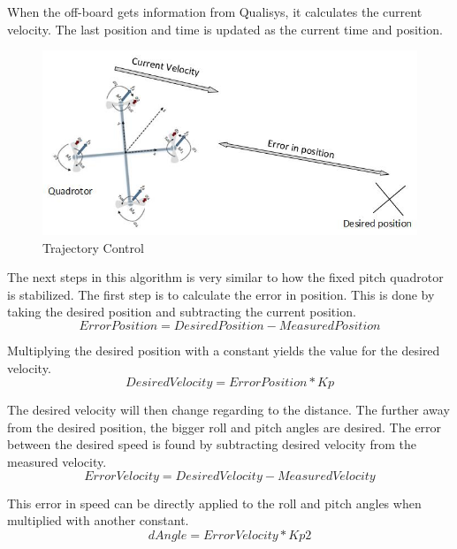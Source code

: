 When the off-board gets information from Qualisys, it calculates the current velocity. The last position and time is updated as the current time and position. \bigskip %

\begin{figure}[H]
          \centering
            \includegraphics[scale = 0.67]{VAPIQ-PICTURES/OBCS.jpg}
                \caption{Trajectory Control}
                \label{TrajectoryControl}
            \label{fig:trajectory}
\end{figure} 

The next steps in this algorithm is very similar to how the fixed pitch quadrotor is stabilized. The first step is to calculate the error in position. This is done by taking the desired position and subtracting the current position.
\begin{equation}
   Error Position = Desired Position - Measured Position
\end{equation}

Multiplying the desired position with a constant yields the value for the desired velocity. 
\begin{equation}
   Desired Velocity = Error Position * Kp
\end{equation}

The desired velocity will then change regarding to the distance. The further away from the desired position, the bigger roll and pitch angles are desired. The error between the desired speed is found by subtracting desired velocity from the measured velocity.
\begin{equation}
    Error Velocity = Desired Velocity - Measured Velocity
\end{equation}

This error in speed can be directly applied to the roll and pitch angles when multiplied with another constant. 
\begin{equation}
   dAngle =  Error Velocity * Kp2
\end{equation}

